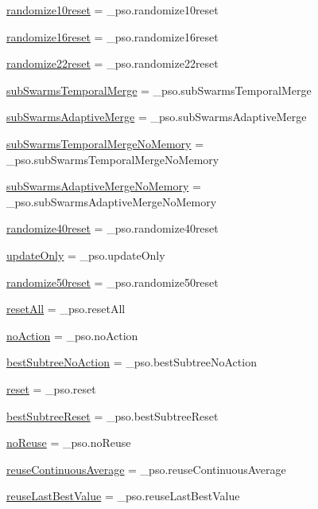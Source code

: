 \begin{CompactItemize}
\item 
\hyperlink{namespacepso_7fdd5e29189f9d9656bd03d9e03dd090}{randomize10reset} = \_\-pso.randomize10reset
\item 
\hyperlink{namespacepso_5df7a62ecfc956224a62f3799a3e6ef7}{randomize16reset} = \_\-pso.randomize16reset
\item 
\hyperlink{namespacepso_ab1bfa5a8f773b0dbd108e56e463ead6}{randomize22reset} = \_\-pso.randomize22reset
\item 
\hyperlink{namespacepso_debdf9baf8a4e2556c5038691f2dd74f}{subSwarmsTemporalMerge} = \_\-pso.subSwarmsTemporalMerge
\item 
\hyperlink{namespacepso_8f1f2f1a4d2cf72cdcf78a45126c214f}{subSwarmsAdaptiveMerge} = \_\-pso.subSwarmsAdaptiveMerge
\item 
\hyperlink{namespacepso_08235d686c3fa57b7ff88c31c1daadde}{subSwarmsTemporalMergeNoMemory} = \_\-pso.subSwarmsTemporalMergeNoMemory
\item 
\hyperlink{namespacepso_96418ff4d13777d965c2625ee7ef4e04}{subSwarmsAdaptiveMergeNoMemory} = \_\-pso.subSwarmsAdaptiveMergeNoMemory
\item 
\hyperlink{namespacepso_5b0754f983b633969aaa27a602045d33}{randomize40reset} = \_\-pso.randomize40reset
\item 
\hyperlink{namespacepso_018821983caf2879464cd3fe04ee7bc2}{updateOnly} = \_\-pso.updateOnly
\item 
\hyperlink{namespacepso_b570ec3df9712e6dd6f523f3919d8bbf}{randomize50reset} = \_\-pso.randomize50reset
\item 
\hyperlink{namespacepso_135ca2d5d4796d11a74a954dd02ec285}{resetAll} = \_\-pso.resetAll
\item 
\hyperlink{namespacepso_07ff59caf4cb767c47b442f92815c537}{noAction} = \_\-pso.noAction
\item 
\hyperlink{namespacepso_2737e8486a12d9feb9ae65b954f424e3}{bestSubtreeNoAction} = \_\-pso.bestSubtreeNoAction
\item 
\hyperlink{namespacepso_c7ff04d712f964c312af61b819389cd2}{reset} = \_\-pso.reset
\item 
\hyperlink{namespacepso_2211a1f30d45c28cceff06417420201c}{bestSubtreeReset} = \_\-pso.bestSubtreeReset
\item 
\hyperlink{namespacepso_d3b0bd0faf8342c3e79f1c86d91c8dde}{noReuse} = \_\-pso.noReuse
\item 
\hyperlink{namespacepso_038f74c833db193a2085387ceccea23f}{reuseContinuousAverage} = \_\-pso.reuseContinuousAverage
\item 
\hyperlink{namespacepso_72127295dfa004794c965c42900116d2}{reuseLastBestValue} = \_\-pso.reuseLastBestValue
\end{CompactItemize}


